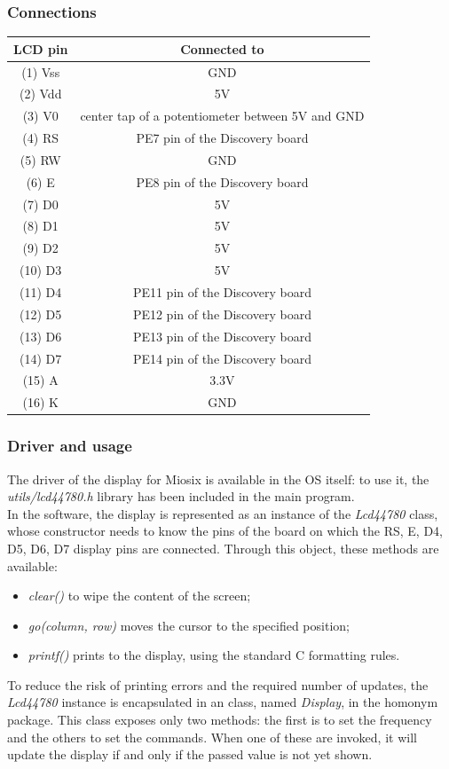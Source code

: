 \subsubsection{Connections}
\begin{tabular}{|c|c|}
	\hline 
	\textbf{LCD pin} & \textbf{Connected to} \\ 
	\hline 
	(1) Vss & GND \\ 
	\hline 
	(2) Vdd & 5V \\ 
	\hline 
	(3) V0 & center tap of a potentiometer between 5V and GND \\ 
	\hline 
	(4) RS & PE7 pin of the Discovery board \\ 
	\hline 
	(5) RW & GND \\ 
	\hline 
	(6) E & PE8 pin of the Discovery board \\ 
	\hline 
	(7) D0 & 5V \\ 
	\hline 
	(8) D1 & 5V \\ 
	\hline 
	(9) D2 & 5V \\ 
	\hline 
	(10) D3 & 5V \\ 
	\hline 
	(11) D4 & PE11 pin of the Discovery board \\ 
	\hline 
	(12) D5 & PE12 pin of the Discovery board \\ 
	\hline 
	(13) D6 & PE13 pin of the Discovery board \\ 
	\hline 
	(14) D7 & PE14 pin of the Discovery board \\ 
	\hline 
	(15) A & 3.3V \\ 
	\hline 
	(16) K & GND \\ 
	\hline 
\end{tabular} 

\subsubsection{Driver and usage}
The driver of the display for Miosix is available in the OS itself: to use it, the \textit{utils/lcd44780.h} library has been included in the main program. \\
	In the software, the display is represented as an instance of the \textit{Lcd44780} class, whose constructor needs to know the pins of the board on which the RS, E, D4, D5, D6, D7 display pins are connected. Through this object, these methods are available:
 \begin{itemize}
 	\item \textit{clear()} to wipe the content of the screen;
 	\item \textit{go(column, row)} moves the cursor to the specified position;
 	\item \textit{printf()} prints to the display, using the standard C formatting rules.
 \end{itemize}

To reduce the risk of printing errors and the required number of updates, the \textit{Lcd44780} instance is encapsulated in an class, named \textit{Display}, in the homonym package. This class exposes only two methods: the first is to set the frequency and the others to set the commands. When one of these are invoked, it will update the display if and only if the passed value is not yet shown.